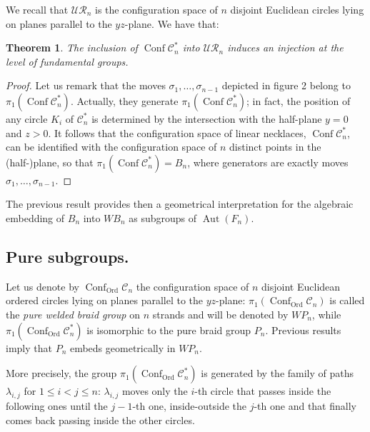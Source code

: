 \documentclass[11pt]{amsart}
\newtheorem{theorem}{Theorem}
\begin{document}
We recall that $\mathcal{UR}_n$ is the configuration space  of $n$ 
disjoint Euclidean circles lying on planes parallel to the $yz$-plane.
We have that:
\begin{theorem}
The inclusion of  ${\mathop{\mathrm{Conf}}\nolimits} \mathcal{C}^*_n$ into $\mathcal{UR}_n$ induces an injection at the level 
of fundamental groups.
\end{theorem}
\begin{proof}
Let us remark that the moves $\sigma_1, \ldots, \sigma_{n-1}$ depicted in figure 2 belong to $\pi_1({\mathop{\mathrm{Conf}}\nolimits} \mathcal{C}^*_n) $. Actually, they
generate $\pi_1({\mathop{\mathrm{Conf}}\nolimits} \mathcal{C}^*_n) $; in fact, the position of any circle $K_i$ of $\mathcal{C}^*_n$
is determined by the intersection with the half-plane $y=0$ and $z>0$.
It follows that the configuration space of linear necklaces, ${\mathop{\mathrm{Conf}}\nolimits} \mathcal{C}^*_n$, 
can be identified with the configuration space of $n$ distinct points in the (half-)plane, 
so that $\pi_1({\mathop{\mathrm{Conf}}\nolimits} \mathcal{C}^*_n) =B_n$,  where  generators are  exactly moves $\sigma_1, \ldots, \sigma_{n-1}$.
\end{proof}

The previous result provides then a geometrical interpretation for the algebraic embedding of 
$B_n$ into $WB_n$ as subgroups of ${\mathop{\mathrm{Aut}}\nolimits}(F_n)$.

\subsection*{Pure subgroups.}

Let us denote by ${\mathop{\mathrm{Conf}}\nolimits}_{\text{Ord}}\mathcal{C}_n$ the configuration space of $n$ 
disjoint Euclidean  ordered circles lying on planes parallel to the $yz$-plane:
 $\pi_1({\mathop{\mathrm{Conf}}\nolimits}_{\text{Ord}} \mathcal{C}_n)$ is called the {\emph{{pure welded  braid group}}} on $n$ strands and will be denoted by $WP_n$,
 while $\pi_1({\mathop{\mathrm{Conf}}\nolimits}_{\text{Ord}} \mathcal{C}^*_n)$ is isomorphic to the pure braid group $P_n$.  Previous results imply that $P_n$ embeds geometrically in 
 $WP_n$.
 
More precisely, the group  $\pi_1({\mathop{\mathrm{Conf}}\nolimits}_{\text{Ord}} \mathcal{C}^*_n)$  is generated 
 by the family of paths $\lambda_{i,j}$ for $1{\leqslant} i < j {\leqslant} n$:  $\lambda_{i,j}$ moves 
 only the $i$-th circle that  passes inside  the following ones until the $j-1$-th one, 
  inside-outside the  $j$-th one and that  finally comes back passing inside the other circles.
 
\end{document}

